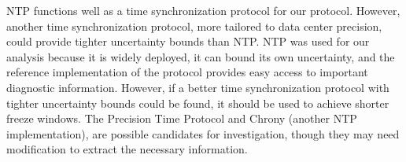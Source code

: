 NTP functions well as a time synchronization protocol for our protocol. However, another time synchronization protocol, more tailored to data center precision, could provide tighter uncertainty bounds than NTP. NTP
was used for our analysis because it is widely deployed, it can bound
its own uncertainty, and the reference implementation of the protocol
provides easy access to important diagnostic information. However, if a better time synchronization protocol with tighter uncertainty bounds could be found, it should be used to achieve shorter freeze windows. The Precision Time Protocol and Chrony (another NTP implementation), are possible candidates for investigation, though they may need modification to extract the necessary information.

